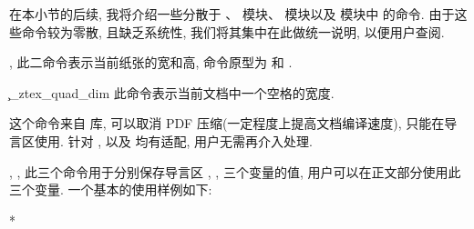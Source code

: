 在本小节的后续, 我将介绍一些分散于 、 模块、 模块以及  模块中
的命令. 由于这些命令较为零散, 且缺乏系统性, 我们将其集中在此做统一说明, 以便用户查阅.


\begin{function}[added=2024-12-05]{\zpw, \zph}
  此二命令表示当前纸张的宽和高, 命令原型为  和 .
\end{function}


\begin{function}{\c_ztex_quad_dim}
  此命令表示当前文档中一个空格的宽度.
\end{function}


\begin{function}[added=2025-09-20]{\uncompressPDF}
  这个命令来自  库, 可以取消 PDF 压缩(一定程度上提高文档编译速度), 只能在导言区使用. 
  针对 ,  以及  均有适配, 用户无需再介入处理.
\end{function}


\begin{function}[updated=2025-04-25]{\ztextitle, \ztexauthor, \ztexdate}
  此三个命令用于分别保存导言区 \cmd{\@title}, \cmd{\@author}, \cmd{\@date} 三个变量的值, 
  用户可以在正文部分使用此三个变量. 一个基本的使用样例如下:
\end{function}
\begin{DocExample}*
  \ztextitle\par
  \ztexauthor\par
  \ztexdate
\end{DocExample}